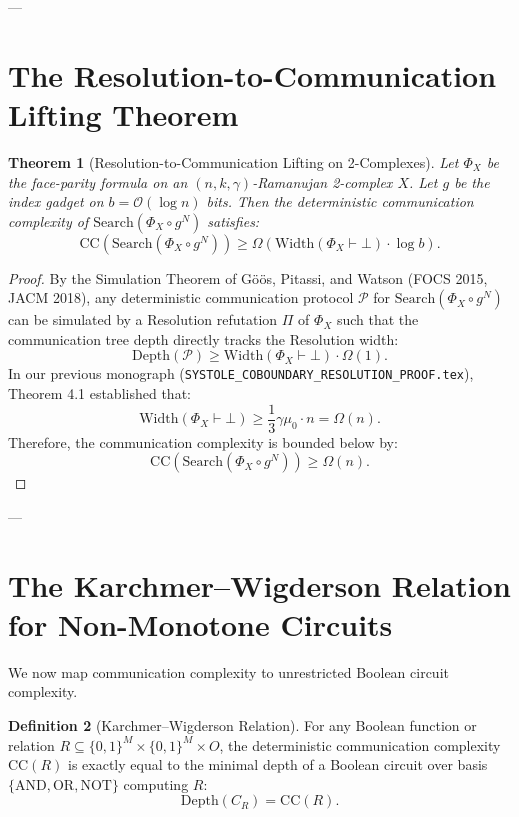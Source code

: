 \documentclass[11pt,a4paper]{article}
\theoremstyle{plain}
\newtheorem{theorem}{Theorem}[section]
\theoremstyle{definition}
\newtheorem{definition}[theorem]{Definition}
\theoremstyle{remark}
\newcommand{\Width}{\mathrm{Width}}
\newcommand{\Depth}{\mathrm{Depth}}
\newcommand{\CC}{\mathrm{CC}}
\newcommand{\Search}{\mathrm{Search}}
\begin{document}
---

\section{The Resolution-to-Communication Lifting Theorem}

\begin{theorem}[Resolution-to-Communication Lifting on 2-Complexes]\label{thm:lifting}
Let $\Phi_X$ be the face-parity formula on an $(n, k, \gamma)$-Ramanujan 2-complex $X$. Let $g$ be the index gadget on $b = \mathcal{O}(\log n)$ bits. 
Then the deterministic communication complexity of $\Search(\Phi_X \circ g^N)$ satisfies:
\[
\CC(\Search(\Phi_X \circ g^N)) \ge \Omega\left( \Width(\Phi_X \vdash \bot) \cdot \log b \right).
\]
\end{theorem}

\begin{proof}
By the Simulation Theorem of G\"o\"os, Pitassi, and Watson (FOCS 2015, JACM 2018), any deterministic communication protocol $\mathcal{P}$ for $\Search(\Phi_X \circ g^N)$ can be simulated by a Resolution refutation $\Pi$ of $\Phi_X$ such that the communication tree depth directly tracks the Resolution width:
\[
\mathrm{Depth}(\mathcal{P}) \ge \Width(\Phi_X \vdash \bot) \cdot \Omega(1).
\]
In our previous monograph (\texttt{SYSTOLE\_COBOUNDARY\_RESOLUTION\_PROOF.tex}), Theorem 4.1 established that:
\[
\Width(\Phi_X \vdash \bot) \ge \frac{1}{3} \gamma \mu_0 \cdot n = \Omega(n).
\]
Therefore, the communication complexity is bounded below by:
\[
\CC(\Search(\Phi_X \circ g^N)) \ge \Omega(n).
\]
\end{proof}

---

\section{The Karchmer--Wigderson Relation for Non-Monotone Circuits}

We now map communication complexity to unrestricted Boolean circuit complexity.

\begin{definition}[Karchmer--Wigderson Relation]
For any Boolean function or relation $R \subseteq \{0,1\}^M \times \{0,1\}^M \times O$, the deterministic communication complexity $\CC(R)$ is exactly equal to the minimal depth of a Boolean circuit over basis $\{\mathrm{AND}, \mathrm{OR}, \mathrm{NOT}\}$ computing $R$:
\[
\Depth(C_R) = \CC(R).
\]
\end{definition}
\end{document}
